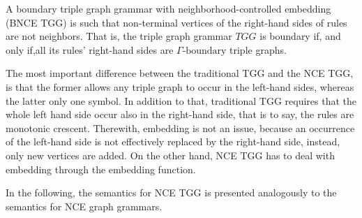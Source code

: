 \documentclass[]{report}
\begin{document}
\begin{definition}
	A boundary triple graph grammar with neighborhood-controlled embedding (BNCE TGG) is such that non-terminal vertices of the right-hand sides of rules are not neighbors. That is, the triple graph grammar $TGG$ is boundary if, and only if,all its rules' right-hand sides are $\Gamma\text{-boundary}$ triple graphs.
\end{definition}

The most important difference between the traditional TGG and the NCE TGG, is that the former allows any triple graph to occur in the left-hand sides, whereas the latter only one symbol. In addition to that, traditional TGG requires that the whole left hand side occur also in the right-hand side, that is to say, the rules are monotonic crescent. Therewith, embedding is not an issue, because an occurrence of the left-hand side is not effectively replaced by the right-hand side, instead, only new vertices are added. On the other hand, NCE TGG has to deal with embedding through the embedding function.

In the following, the semantics for NCE TGG is presented analogously to the semantics for NCE graph grammars.
\end{document}
